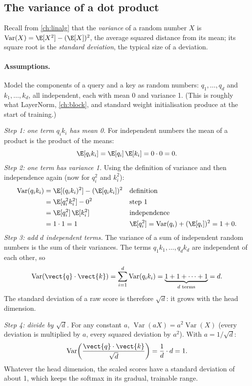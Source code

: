 \subsection{The variance of a dot product}

Recall from \cref{ch:linalg} that the \emph{variance} of a random number $X$ is
$\operatorname{Var}(X) = \E[X^2] - (\E[X])^2$, the average squared distance from its mean; its
square root is the \emph{standard deviation}, the typical size of a deviation.

\paragraph{Assumptions.} Model the components of a query and a key as random numbers:
$q_1,\dots,q_d$ and $k_1,\dots,k_d$, all independent, each with mean 0 and variance 1. (This is roughly
what LayerNorm, \cref{ch:block}, and standard weight initialisation produce at the start of
training.)

\emph{Step 1: one term $q_i k_i$ has mean 0.} For independent numbers the mean of a product is the
product of the means:
\[
  \E[q_i k_i] = \E[q_i]\,\E[k_i] = 0\cdot0 = 0 .
\]
\emph{Step 2: one term has variance 1.} Using the definition of variance and then independence
again (now for $q_i^2$ and $k_i^2$):
\begin{align*}
  \operatorname{Var}(q_i k_i) &= \E[(q_i k_i)^2] - (\E[q_i k_i])^2 && \text{definition}\\
  &= \E[q_i^2 k_i^2] - 0^2 && \text{step 1}\\
  &= \E[q_i^2]\,\E[k_i^2] && \text{independence}\\
  &= 1\cdot1 = 1 && \E[q_i^2] = \operatorname{Var}(q_i) + (\E[q_i])^2 = 1 + 0 .
\end{align*}
\emph{Step 3: add $d$ independent terms.} The variance of a sum of independent random numbers is
the sum of their variances. The terms $q_1k_1, \dots, q_dk_d$ are independent of each other, so
\begin{equation}\label{eq:attention:vard}
  \operatorname{Var}(\vect{q}\cdot\vect{k}) = \sum_{i=1}^{d}\operatorname{Var}(q_i k_i) = \underbrace{1 + 1 + \dots + 1}_{d\text{ terms}} = d .
\end{equation}
The standard deviation of a raw score is therefore $\sqrt{d}$: it grows with the head dimension.

\emph{Step 4: divide by $\sqrt d$.} For any constant $a$, $\operatorname{Var}(aX) =
a^2\operatorname{Var}(X)$ (every deviation is multiplied by $a$, every squared deviation by $a^2$).
With $a = 1/\sqrt d$:
\begin{equation}\label{eq:attention:var1}
  \operatorname{Var}\!\left(\frac{\vect{q}\cdot\vect{k}}{\sqrt d}\right) = \frac{1}{d}\cdot d = 1 .
\end{equation}
Whatever the head dimension, the scaled scores have a standard deviation of about 1, which keeps
the softmax in its gradual, trainable range.


